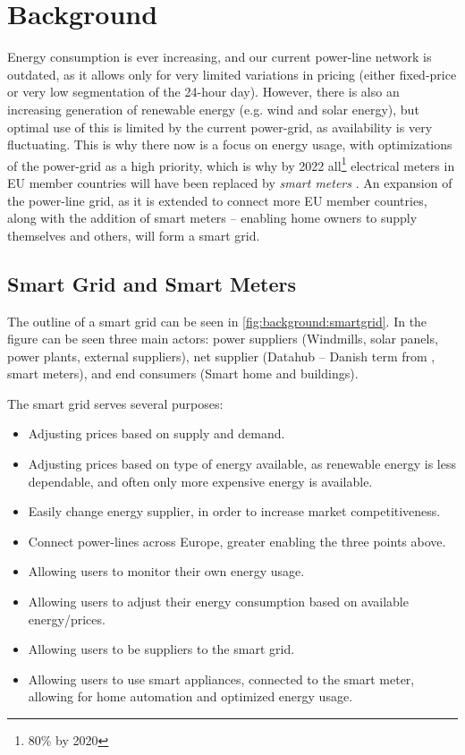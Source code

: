 \section{Background}
Energy consumption is ever increasing, and our current power-line network is outdated, as it allows only for very limited variations in pricing (either fixed-price or very low segmentation of the 24-hour day).
However, there is also an increasing generation of renewable energy (e.g. wind and solar energy), but optimal use of this is limited by the current power-grid, as availability is very fluctuating.
This is why there now is a focus on energy usage, with optimizations of the power-grid as a high priority, which is why by 2022 all\footnote{80\% by 2020} electrical meters in EU member countries will have been replaced by \textit{smart meters} \cite{smart_meter_survey} \cite{directive_2009_72_EC}.
An expansion of the power-line grid, as it is extended to connect more EU member countries, along with the addition of smart meters -- enabling home owners to supply themselves and others, will form a smart grid.

\subsection{Smart Grid and Smart Meters}
The outline of a smart grid can be seen in \cref{fig:background:smartgrid}.
In the figure can be seen three main actors: power suppliers (Windmills, solar panels, power plants, external suppliers), net supplier (Datahub -- Danish term from \cite{LOV_nr_575_af_18-06-2012}, smart meters), and end consumers (Smart home and buildings).

The smart grid serves several purposes:
\begin{itemize}
	\item Adjusting prices based on supply and demand.
	\item Adjusting prices based on type of energy available, as renewable energy is less dependable, and often only more expensive energy is available.
	\item Easily change energy supplier, in order to increase market competitiveness.
	\item Connect power-lines across Europe, greater enabling the three points above.
	\item Allowing users to monitor their own energy usage.
	\item Allowing users to adjust their energy consumption based on available energy/prices.
	\item Allowing users to be suppliers to the smart grid.
	\item Allowing users to use smart appliances, connected to the smart meter, allowing for home automation and optimized energy usage.
\end{itemize}

